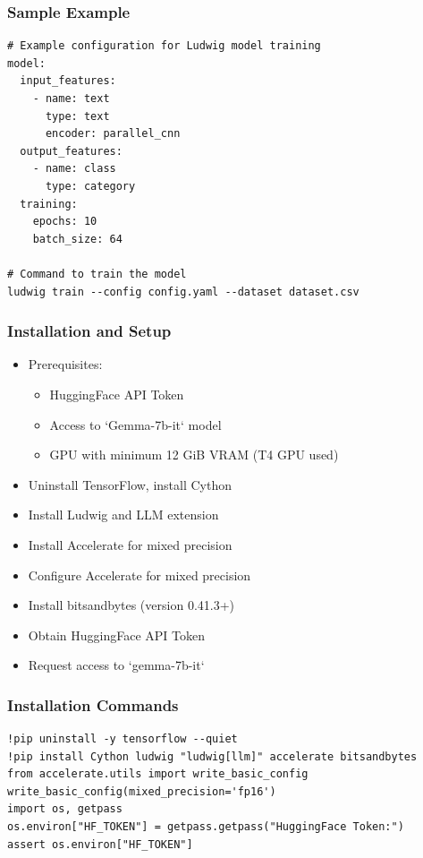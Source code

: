 \begin{frame}[fragile]\frametitle{Sample Example}
\begin{lstlisting}
# Example configuration for Ludwig model training
model:
  input_features:
    - name: text
      type: text
      encoder: parallel_cnn
  output_features:
    - name: class
      type: category
  training:
    epochs: 10
    batch_size: 64

# Command to train the model
ludwig train --config config.yaml --dataset dataset.csv
\end{lstlisting}
\end{frame}

\begin{frame}[fragile]\frametitle{Installation and Setup}
\begin{itemize}
\item Prerequisites:
    \begin{itemize}
    \item HuggingFace API Token
    \item Access to `Gemma-7b-it` model
    \item GPU with minimum 12 GiB VRAM (T4 GPU used)
    \end{itemize}
\item Uninstall TensorFlow, install Cython
\item Install Ludwig and LLM extension
\item Install Accelerate for mixed precision
\item Configure Accelerate for mixed precision
\item Install bitsandbytes (version 0.41.3+)
\item Obtain HuggingFace API Token
\item Request access to `gemma-7b-it`
\end{itemize}
\end{frame}

\begin{frame}[fragile]\frametitle{Installation Commands}
\begin{lstlisting}
!pip uninstall -y tensorflow --quiet
!pip install Cython ludwig "ludwig[llm]" accelerate bitsandbytes
from accelerate.utils import write_basic_config
write_basic_config(mixed_precision='fp16')
import os, getpass
os.environ["HF_TOKEN"] = getpass.getpass("HuggingFace Token:")
assert os.environ["HF_TOKEN"]
\end{lstlisting}
\end{frame}

